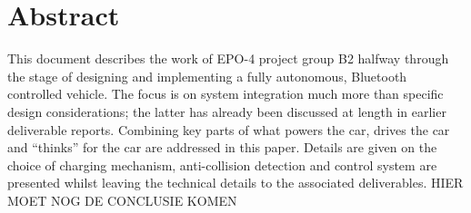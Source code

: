 \documentclass[11pt,titlepage]{report}
\begin{document}
\section*{Abstract}
This document describes the work of EPO-4 project group B2 halfway through the stage of designing and implementing a fully autonomous, Bluetooth controlled vehicle. The focus is on system integration much more than specific design considerations; the latter has already been discussed at length in earlier deliverable reports. Combining key parts of what powers the car, drives the car and ``thinks'' for the car are addressed in this paper. Details are given on the choice of charging mechanism, anti-collision detection and control system are presented whilst leaving the technical details to the associated deliverables. 
HIER MOET NOG DE CONCLUSIE KOMEN
\end{document}
